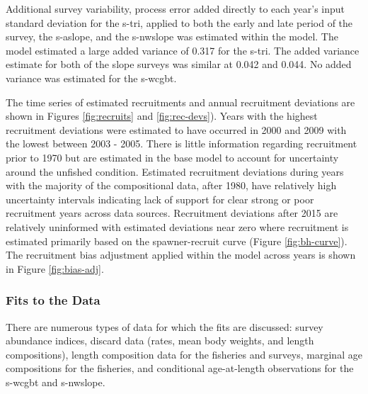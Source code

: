 \documentclass[11pt,
  english,
  a4paper,
]{article}
\begin{document}

Additional survey variability, process error added directly to each year's input standard deviation for the \gls{s-tri}, applied to both the early and late period of the survey, the \gls{s-aslope}, and the \gls{s-nwslope} was estimated within the model. The model estimated a large added variance of 0.317 for the \gls{s-tri}. The added variance estimate for both of the slope surveys was similar at 0.042 and 0.044. No added variance was estimated for the \gls{s-wcgbt}.

\leavevmode\tagmcend\tagstructend\par


The time series of estimated recruitments and annual recruitment deviations are shown in Figures \ref{fig:recruits} and \ref{fig:rec-devs}). Years with the highest recruitment deviations were estimated to have occurred in 2000 and 2009 with the lowest between 2003 - 2005. There is little information regarding recruitment prior to 1970 but are estimated in the base model to account for uncertainty around the unfished condition. Estimated recruitment deviations during years with the majority of the compositional data, after 1980, have relatively high uncertainty intervals indicating lack of support for clear strong or poor recruitment years across data sources. Recruitment deviations after 2015 are relatively uninformed with estimated deviations near zero where recruitment is estimated primarily based on the spawner-recruit curve (Figure \ref{fig:bh-curve}). The recruitment bias adjustment applied within the model across years is shown in Figure \ref{fig:bias-adj}.

\leavevmode\tagmcend\tagstructend\par


\hypertarget{fits-to-the-data}{%
\subsubsection{Fits to the Data}\label{fits-to-the-data}}

\leavevmode\tagmcend\tagstructend


There are numerous types of data for which the fits are discussed: survey abundance indices, discard data (rates, mean body weights, and length compositions), length composition data for the fisheries and surveys, marginal age compositions for the fisheries, and conditional age-at-length observations for the \gls{s-wcgbt} and \gls{s-nwslope}.
\end{document}
